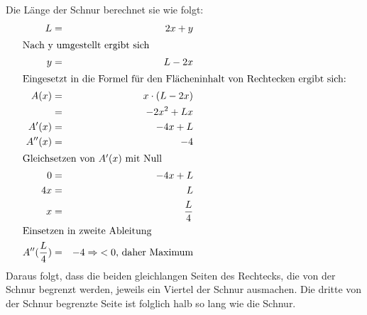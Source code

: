 \documentclass[10pt,a4paper,oneside,ngerman,numbers=noenddot]{scrartcl}
\begin{document}
\section{} %
Die Länge der Schnur berechnet sie wie folgt:\\
\begin{alignat*}{2}
L &=& 2x + y \\
\intertext{Nach y umgestellt ergibt sich}
y &=& L - 2x \\
\intertext{Eingesetzt in die Formel für den Flächeninhalt von Rechtecken ergibt sich:}
A(x) &=& x \cdot (L-2x) \\
&=& -2x^{2} + Lx \\
A'(x) &=& -4x + L \\
A''(x) &=& -4 \\
\intertext{Gleichsetzen von $A'(x)$ mit Null}
0 &=& -4x + L \\
4x &=& L \\
x &=& \frac{L}{4} \\
\intertext{Einsetzen in zweite Ableitung}
A''(\frac{L}{4}) &=& -4 \Rightarrow \text{$< 0$, daher Maximum}
\end{alignat*}
Daraus folgt, dass die beiden gleichlangen Seiten des Rechtecks, die von der Schnur begrenzt werden, jeweils ein Viertel der Schnur ausmachen. Die dritte von der Schnur begrenzte Seite ist folglich halb so lang wie die Schnur.
\section{} %
\end{document}
